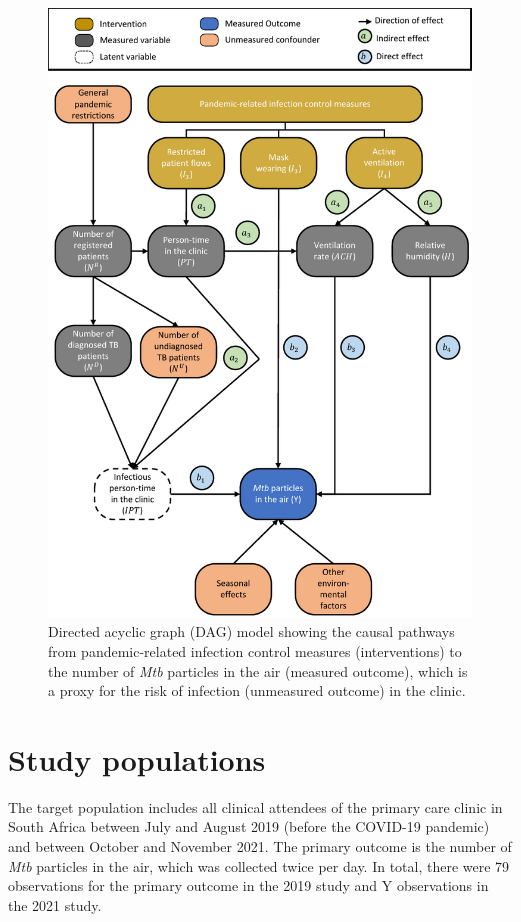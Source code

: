 \documentclass{article}
\begin{document}
\begin{figure}[!htpb]
    \centering
    \caption{Directed acyclic graph (DAG) model showing the causal pathways from pandemic-related infection control measures (interventions) to the number of \emph{Mtb} particles in the air (measured outcome), which is a proxy for the risk of infection (unmeasured outcome) in the clinic.}
    \label{fig:dag}
    \includegraphics{dag.pdf}
\end{figure}
	
\section{Study populations}

The target population includes all clinical attendees of the primary care clinic in South Africa between July and August 2019 (before the COVID-19 pandemic) and between October and November 2021. The primary outcome is the number of \emph{Mtb} particles in the air, which was collected twice per day. In total, there were 79 observations for the primary outcome in the 2019 study and Y observations in the 2021 study.
\end{document}
